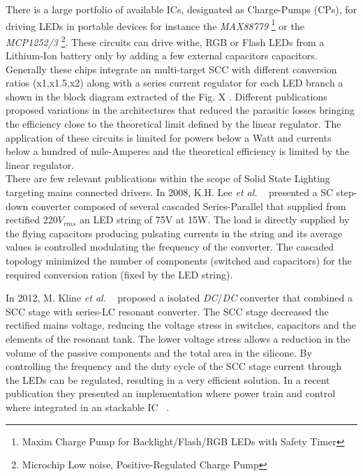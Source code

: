 There is a large portfolio of available ICs, designated as Charge-Pumps (CPs), for driving LEDs in portable devices  for instance  the \emph{MAX88779} \footnote{Maxim\textsuperscript{\textregistered} Charge Pump for Backlight/Flash/RGB LEDs with Safety Timer } or the \emph{MCP1252/3} \footnote{Microchip\textsuperscript{\textregistered} Low noise, Positive-Regulated Charge Pump}. These circuits  can drive withe, RGB or Flash LEDs from a Lithium-Ion battery only by adding a few external capacitors capacitors.  Generally these chips integrate an multi-target SCC with different conversion ratios (x1,x1.5,x2) along with a series current regulator for each LED branch a shown in the block diagram extracted  of the Fig. X . Different publications ~\cite{07Feng,09Wu,10Yin} proposed variations in the architectures that reduced the parasitic losses bringing the efficiency close to the theoretical limit defined by the linear regulator. The application of these circuits is limited for powers below a Watt and currents below a hundred of mile-Amperes and the theoretical efficiency is limited by the linear regulator.\\


There are few relevant publications within the scope of Solid State Lighting targeting mains connected drivers. In 2008, K.H. Lee \emph{et al.} ~\cite{08Lee} presented a SC step-down converter composed of several cascaded Series-Parallel that supplied from rectified 220$V_{rms}$ an LED string of 75V at 15W. The load is directly supplied by the flying capacitors producing pulsating currents in the string and its average values is controlled modulating the frequency of the converter. The cascaded topology minimized the number of components (switched and capacitors) for the required conversion ration (fixed by the LED string).

In 2012, M. Kline \emph{et al.} ~\cite{12Kline} proposed a isolated \emph{DC}/\emph{DC} converter that combined a SCC stage with series-LC resonant converter.  The SCC stage decreased  the rectified mains voltage, reducing the voltage stress in switches, capacitors and the elements of the resonant tank. The lower voltage stress allows a reduction in the volume of the passive components and the total area in the silicone. By controlling the frequency and the duty cycle of the SCC stage current through the LEDs can be regulated, resulting in a very efficient solution. In a recent publication they presented an implementation where power train and control where integrated in an stackable IC ~\cite{13Kline}.  \\

